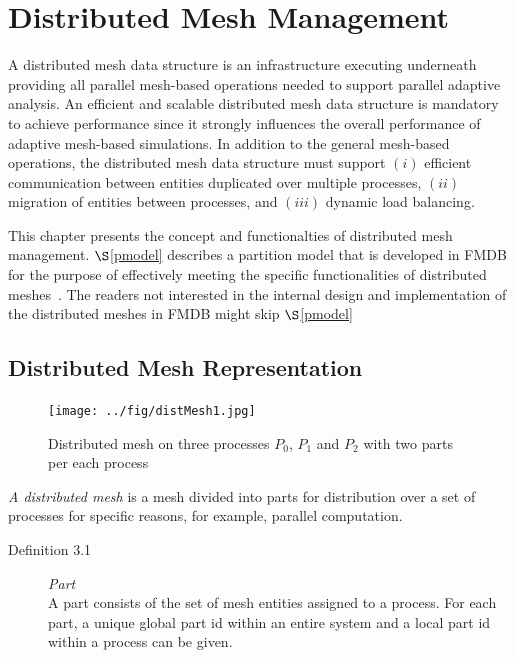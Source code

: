\section{Distributed Mesh Management}  

A distributed mesh data structure is an infrastructure executing 
underneath providing all parallel mesh-based operations needed to support
parallel adaptive analysis. An efficient and scalable distributed mesh data structure is
 mandatory to achieve performance since it strongly influences
the overall performance of adaptive mesh-based simulations. In addition to
the general mesh-based operations, the distributed
mesh data structure must support $(i)$ efficient communication between
 entities duplicated over multiple processes, $(ii)$ migration of entities
 between processes, and $(iii)$ dynamic load balancing. 

This chapter presents the concept and functionalties of distributed mesh management. $\S$\ref{pmodel} describes a partition model that is developed in FMDB for the purpose of effectively meeting the specific functionalities of distributed meshes~\cite{seolthesis, fmdb06}. The readers not interested in the internal design and implementation of the distributed meshes in FMDB might skip $\S$\ref{pmodel}

\subsection{Distributed Mesh Representation}  

\begin{figure}
\centering
\texttt{[image: ../fig/distMesh1.jpg]}
\caption[Distributed mesh on three processes with two parts per process]{Distributed mesh on three processes $P_0$, $P_1$ and $P_2$ with two parts per each process}
\label{distMesh1}  %
\end{figure}

\emph{A distributed mesh} is a mesh divided into parts for distribution
over a set of processes for specific reasons, for example, parallel computation.

\begin{description}
\item[Definition 3.1] \emph{Part}\\
A part consists of the set of mesh entities assigned to a
process. For each part, a unique global part id within an entire system and a local part id within a process can be given.
\end{description}


